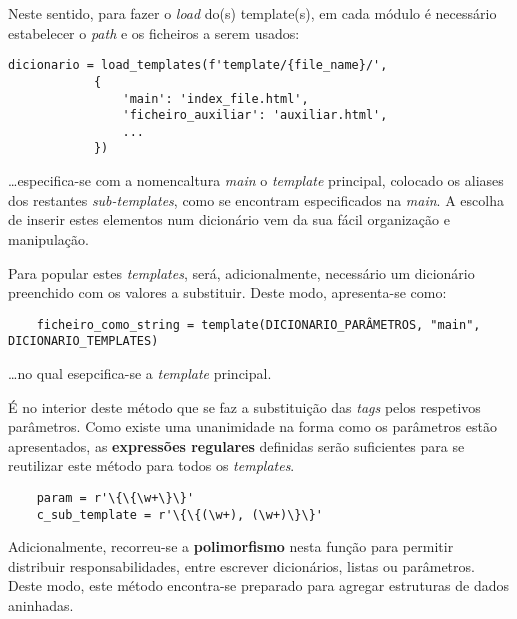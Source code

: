 Neste sentido, para fazer o \textit{load} do(s) template(s), em cada módulo é necessário estabelecer o \textit{path} e os ficheiros a serem usados:
\begin{verbatim}
dicionario = load_templates(f'template/{file_name}/', 
            {
                'main': 'index_file.html',
                'ficheiro_auxiliar': 'auxiliar.html',
                ...
            })
\end{verbatim} 

\dots especifica-se com a nomencaltura \textit{main} o \textit{template} principal, colocado os aliases dos restantes \textit{sub-templates}, como 
se encontram especificados na \textit{main}.
A escolha de inserir estes elementos num dicionário vem da sua fácil organização e manipulação.

Para popular estes \textit{templates}, será, adicionalmente, necessário um dicionário preenchido com os valores a substituir.
Deste modo, apresenta-se como:
\begin{verbatim}
    ficheiro_como_string = template(DICIONARIO_PARÂMETROS, "main", DICIONARIO_TEMPLATES)
\end{verbatim}

\dots no qual esepcifica-se a \textit{template} principal.

É no interior deste método que se faz a substituição das \textit{tags} pelos respetivos parâmetros.
Como existe uma unanimidade na forma como os parâmetros estão apresentados, as \textbf{expressões regulares} definidas
serão suficientes para se reutilizar este método para todos os \textit{templates}.

\begin{verbatim}
    param = r'\{\{\w+\}\}'
    c_sub_template = r'\{\{(\w+), (\w+)\}\}'
\end{verbatim}

Adicionalmente, recorreu-se a \textbf{polimorfismo} nesta função para permitir distribuir responsabilidades, entre escrever dicionários, listas ou parâmetros.
Deste modo, este método encontra-se preparado para agregar estruturas de dados aninhadas.